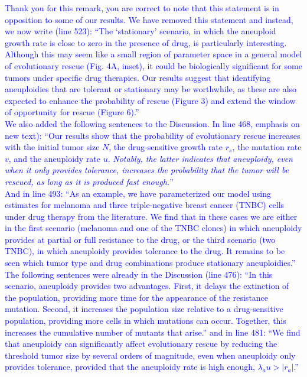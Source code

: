 \documentclass[12pt]{extarticle}
\renewcommand{\Delta}{r}
\begin{document}
\textcolor{blue}{
Thank you for this remark, you are correct to note that this statement is in opposition to some of our results. We have removed this statement and instead, we now write (line 523): ``The `stationary' scenario, in which the aneuploid growth rate is close to zero in the presence of drug, is particularly interesting. Although this may seem like a small region of parameter space in a general model of evolutionary rescue (Fig. 4A, inset), it could be biologically significant for some tumors under specific drug therapies. 
Our results suggest that identifying aneuploidies that are tolerant or stationary may be worthwhile, as these are also expected to enhance the probability of rescue (Figure 3) and extend the window of opportunity for rescue (Figure 6).''\\
We also added the following sentences to the Discussion.
In line 468, emphasis on new text): ``Our results show that the probability of evolutionary rescue increases with the initial tumor size $N$, the drug-sensitive growth rate $\Delta_s$, the mutation rate $v$, and the aneuploidy rate $u$. \emph{Notably, the latter indicates that aneuploidy, even when it only provides tolerance, increases the probability that the tumor will be rescued, as long as it is produced fast enough.}'' \\
And in line 493: ``As an example, we have parameterized our model using estimates for melanoma and three triple-negative breast cancer (TNBC) cells under drug therapy from the literature. 
We find that in these cases we are either in the first scenario (melanoma and one of the TNBC clones) in which aneuploidy provides at partial or full resistance to the drug, or the third scenario (two TNBC), in which aneuploidy provides tolerance to the drug. 
It remains to be seen which tumor type and drug combinations produce stationary aneuploidies.''\\
The following sentences were already in the Discussion (line 476): ``In this scenario, aneuploidy provides two advantages. First, it delays the extinction of the population, providing more time for the appearance of the resistance mutation. 
Second, it increases the population size relative to a drug-sensitive population, providing more cells in which mutations can occur. 
Together, this increases the cumulative number of mutants that arise.'' and in line 481: ``We find that aneuploidy can significantly affect evolutionary rescue by reducing the threshold tumor size by several orders of magnitude, even when aneuploidy only provides tolerance, provided that the aneuploidy rate is high enough, $\lambda_a u > |\Delta_a|$.''
} 
\end{document}

